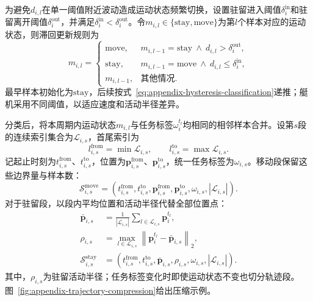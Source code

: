 为避免$d_{i,l}$在单一阈值附近波动造成运动状态频繁切换，设置驻留进入阈值$\delta_i^{\mathrm{in}}$和驻留离开阈值$\delta_i^{\mathrm{out}}$，并满足$\delta_i^{\mathrm{in}}<\delta_i^{\mathrm{out}}$。令$m_{i,l}\in\{\mathrm{stay},\mathrm{move}\}$为第$l$个样本对应的运动状态，则滞回更新规则为
\begin{equation}
    m_{i,l}=\begin{cases}
        \mathrm{move},
        &m_{i,l-1}=\mathrm{stay}\ \land\
        d_{i,l}>\delta_i^{\mathrm{out}},\\
        \mathrm{stay},
        &m_{i,l-1}=\mathrm{move}\ \land\
        d_{i,l}\leq\delta_i^{\mathrm{in}},\\
        m_{i,l-1}, &\text{其他情况}.
    \end{cases}
    \label{eq:appendix-hysteresis-classification}
\end{equation}
最早样本初始化为$\mathrm{stay}$，后续按式~\eqref{eq:appendix-hysteresis-classification}递推；艇机采用不同阈值，以适应速度和活动半径差异。

分类后，将本周期内运动状态$m_{i,l}$与任务标签$\omega_i^{t_l}$均相同的相邻样本合并。设第$s$段的连续索引集合为$\mathcal L_{i,s}$，首尾索引为
\begin{equation*}
    l_{i,s}^{\mathrm{from}}=\min\mathcal L_{i,s},
    \qquad
    l_{i,s}^{\mathrm{to}}=\max\mathcal L_{i,s}.
\end{equation*}
记起止时刻为$t_{i,s}^{\mathrm{from}}$、$t_{i,s}^{\mathrm{to}}$，位置为$\boldsymbol p_{i,s}^{\mathrm{from}}$、$\boldsymbol p_{i,s}^{\mathrm{to}}$，统一任务标签为$\omega_{i,s}$。移动段保留这些边界量与样本数：
\begin{equation}
    \mathcal S_{i,s}^{\mathrm{move}}
    =\left(t_{i,s}^{\mathrm{from}},t_{i,s}^{\mathrm{to}},
    \boldsymbol p_{i,s}^{\mathrm{from}},\boldsymbol p_{i,s}^{\mathrm{to}},
    \omega_{i,s},|\mathcal L_{i,s}|\right).
    \label{eq:appendix-moving-segment}
\end{equation}
对于驻留段，以段内平均位置和活动半径代替全部位置点：
\begin{equation}
    \begin{aligned}
    \bar{\boldsymbol p}_{i,s}
    &=\frac{1}{|\mathcal L_{i,s}|}
      \sum_{l\in\mathcal L_{i,s}}\boldsymbol p_i^{t_l},\\
    \rho_{i,s}
    &=\max_{l\in\mathcal L_{i,s}}
      \left\|\boldsymbol p_i^{t_l}-\bar{\boldsymbol p}_{i,s}\right\|_2,\\
    \mathcal S_{i,s}^{\mathrm{stay}}
    &=\left(t_{i,s}^{\mathrm{from}},t_{i,s}^{\mathrm{to}},
      \bar{\boldsymbol p}_{i,s},\rho_{i,s},
      \omega_{i,s},|\mathcal L_{i,s}|\right).
    \end{aligned}
    \label{eq:appendix-stay-segment}
\end{equation}
其中，$\rho_{i,s}$为驻留活动半径；任务标签变化时即使运动状态不变也切分轨迹段。图~\ref{fig:appendix-trajectory-compression}给出压缩示例。

